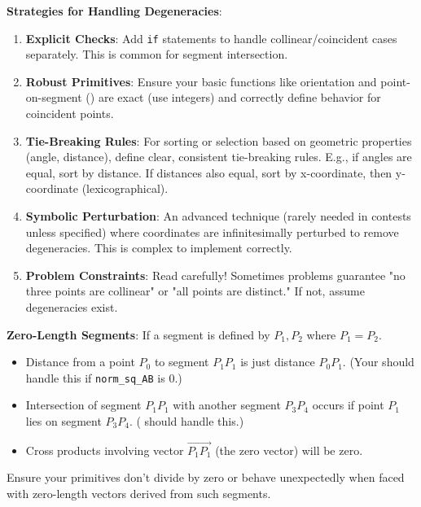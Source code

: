\begin{tipsbox}
\label{tips:A.3.4.handling_degeneracies}
\textbf{Strategies for Handling Degeneracies}:
\begin{enumerate}
    \item \textbf{Explicit Checks}: Add \texttt{if} statements to handle collinear/coincident cases separately. This is common for segment intersection.
    \item \textbf{Robust Primitives}: Ensure your basic functions like orientation and point-on-segment () are exact (use integers) and correctly define behavior for coincident points.
    \item \textbf{Tie-Breaking Rules}: For sorting or selection based on geometric properties (angle, distance), define clear, consistent tie-breaking rules. E.g., if angles are equal, sort by distance. If distances also equal, sort by x-coordinate, then y-coordinate (lexicographical).
    \item \textbf{Symbolic Perturbation}: An advanced technique (rarely needed in contests unless specified) where coordinates are infinitesimally perturbed to remove degeneracies. This is complex to implement correctly.
    \item \textbf{Problem Constraints}: Read carefully! Sometimes problems guarantee "no three points are collinear" or "all points are distinct." If not, assume degeneracies exist.
\end{enumerate}
\end{tipsbox}

\begin{gotcha}
\label{gotcha:A.3.4.zero_length_segments}
\textbf{Zero-Length Segments}: If a segment is defined by $P_1, P_2$ where $P_1=P_2$.
\begin{itemize}
    \item Distance from a point $P_0$ to segment $P_1P_1$ is just distance $P_0P_1$. (Your  should handle this if \texttt{norm\_sq\_AB} is 0.)
    \item Intersection of segment $P_1P_1$ with another segment $P_3P_4$ occurs if point $P_1$ lies on segment $P_3P_4$. ( should handle this.)
    \item Cross products involving vector $\vec{P_1P_1}$ (the zero vector) will be zero.
\end{itemize}
Ensure your primitives don't divide by zero or behave unexpectedly when faced with zero-length vectors derived from such segments.
\end{gotcha}

